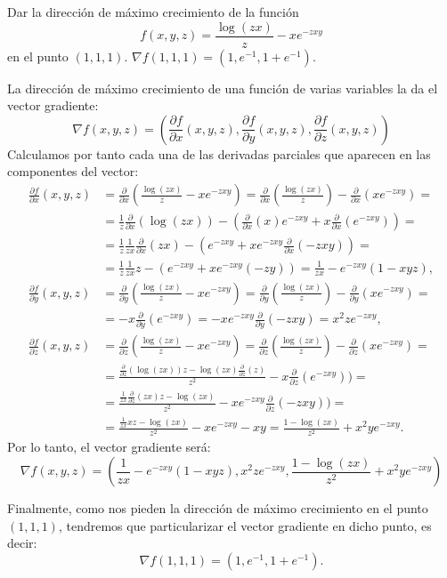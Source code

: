 {Dar la dirección de máximo crecimiento de la función 
\[
f(x,y,z) = \frac{\log(zx)}z-xe^{-zxy}
\]
en el punto $(1,1,1)$.
}
{$\nabla f(1,1,1)=(1,e^{-1},1+e^{-1})$.
}
{La dirección de máximo crecimiento de una función de varias variables la da el vector gradiente: 
\[
\nabla f(x,y,z) = \left(\frac{\partial f}{\partial x}(x,y,z),\frac{\partial f}{\partial y}(x,y,z),\frac{\partial f}{\partial z}(x,y,z)\right)
\]
Calculamos por tanto cada una de las derivadas parciales que aparecen en las componentes del vector:
\begin{align*}
\frac{\partial f}{\partial x}(x,y,z) &= \frac{\partial}{\partial x}(\frac{\log (zx)}z-xe^{-zxy}) = \frac{\partial}{\partial x}(\frac{\log (zx)}z)-\frac{\partial}{\partial x}(xe^{-zxy})= \\
&= \frac{1}{z}\frac{\partial}{\partial x}(\log (zx))-(\frac{\partial}{\partial x}(x)e^{-zxy}+x\frac{\partial}{\partial x}(e^{-zxy}))= \\
&= \frac{1}{z}\frac{1}{zx}\frac{\partial}{\partial x}(zx)-(e^{-zxy}+xe^{-zxy}\frac{\partial}{\partial x}(-zxy))= \\
&= \frac{1}{z}\frac{1}{zx}z-(e^{-zxy}+xe^{-zxy}(-zy)) = \frac{1}{zx}-e^{-zxy}(1-xyz),\\
\frac{\partial f}{\partial y}(x,y,z) &= \frac{\partial}{\partial y}(\frac{\log(zx)}z-xe^{-zxy}) = \frac{\partial}{\partial y}(\frac{\log (zx)}z)-\frac{\partial}{\partial y}(xe^{-zxy})= \\
&= -x\frac{\partial}{\partial y}(e^{-zxy}) = -xe^{-zxy}\frac{\partial}{\partial y}(-zxy)=x^2ze^{-zxy},\\
\frac{\partial f}{\partial z}(x,y,z) &= \frac{\partial}{\partial z}(\frac{\log(zx)}z-xe^{-zxy}) = \frac{\partial}{\partial z}(\frac{\log (zx)}z)-\frac{\partial}{\partial z}(xe^{-zxy})= \\
&= \frac{\frac{\partial}{\partial z}(\log (zx))z-\log (zx)\frac{\partial}{\partial z}(z)}{z^2}-x\frac{\partial}{\partial z}(e^{-zxy}))= \\
&= \frac{\frac 1{zx}\frac \partial {\partial z}(zx)z-\log (zx)}{z^2}-xe^{-zxy}\frac{\partial}{\partial z}(-zxy))= \\
&= \frac{\frac 1{zx}xz-\log (zx)}{z^2}-xe^{-zxy}-xy=\frac{1-\log (zx)}{z^2}+x^2ye^{-zxy}.
\end{align*}
Por lo tanto, el vector gradiente será: 
\[
\nabla f(x,y,z)=(\frac{1}{zx}-e^{-zxy}(1-xyz), x^2ze^{-zxy}, \frac{1-\log (zx)}{z^2}+x^2ye^{-zxy})
\]

Finalmente, como nos pieden la dirección de máximo crecimiento en el punto $(1,1,1)$, tendremos que particularizar el vector gradiente en dicho punto, es decir: 
\[
\nabla f(1,1,1)=(1,e^{-1},1+e^{-1}).
\]
}


